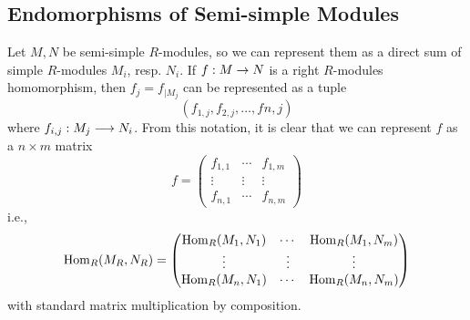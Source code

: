 \subsection{Endomorphisms of Semi-simple Modules}
Let $M,N$ be semi-simple $R$-modules, so we can represent them as a direct sum of simple $R$-modules $M_i$, resp. $N_i$. If $f : M\rightarrow N$ is a right $R$-modules homomorphism, then $f_j  = f_{|M_j}$ can be represented as a tuple
$$(f_{1,j},f_{2,j},\dots , f_{}n,j)$$
where $f_{i,j}:M_j \longrightarrow N_i$. From this notation, it is clear that we can represent $f$ as a $n\times m$ matrix 
$$f = \begin{pmatrix}
f_{1,1} & \cdots & f_{1,m} \\
\vdots & \vdots & \vdots \\
f_{n,1} & \cdots & f_{n,m}
\end{pmatrix}$$
i.e., 
$$\operatorname{Hom}_R(M_R,N_R) = \begin{pmatrix}
\operatorname{Hom}_R(M_1,N_1) & \cdots & \operatorname{Hom}_R(M_1,N_m) \\
\vdots & \vdots & \vdots \\
\operatorname{Hom}_R(M_n,N_1) & \cdots & \operatorname{Hom}_R(M_n,N_m)
\end{pmatrix}$$
with standard matrix multiplication by composition.

